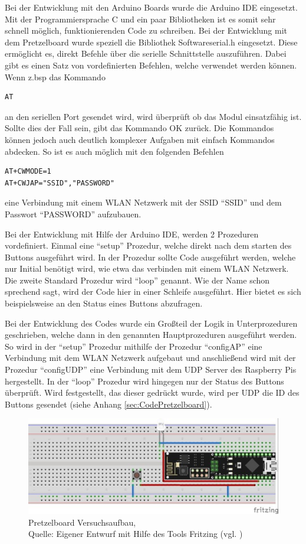 Bei der Entwicklung mit den Arduino Boards wurde die Arduino IDE eingesetzt.
Mit der Programmiersprache C und ein paar Bibliotheken ist es somit sehr schnell möglich, funktionierenden Code zu schreiben.
Bei der Entwicklung mit dem Pretzelboard wurde speziell die Bibliothek Softwareserial.h eingesetzt.
Diese ermöglicht es, direkt Befehle über die serielle Schnittstelle auszuführen.
Dabei gibt es einen Satz von vordefinierten Befehlen, welche verwendet werden können.
Wenn z.bsp das Kommando 
\begin{lstlisting}
AT
\end{lstlisting}
an den seriellen Port gesendet wird, wird überprüft ob das Modul einsatzfähig ist.
Sollte dies der Fall sein, gibt das Kommando OK zurück.
Die Kommandos können jedoch auch deutlich komplexer Aufgaben mit einfach Kommandos abdecken.
So ist es auch möglich mit den folgenden Befehlen
\begin{lstlisting}
AT+CWMODE=1
AT+CWJAP="SSID","PASSWORD"
\end{lstlisting}
eine Verbindung mit einem WLAN Netzwerk mit der SSID ``SSID'' und dem Passwort ``PASSWORD'' aufzubauen.

Bei der Entwicklung mit Hilfe der Arduino \ac{IDE}, werden 2 Prozeduren vordefiniert.
Einmal eine "`setup"' Prozedur, welche direkt nach dem starten des Buttons ausgeführt wird.
In der Prozedur sollte Code ausgeführt werden, welche nur Initial benötigt wird, wie etwa das verbinden mit einem \ac{WLAN} Netzwerk.
Die zweite Standard Prozedur wird "`loop"' genannt.
Wie der Name schon sprechend sagt, wird der Code hier in einer Schleife ausgeführt.
Hier bietet es sich beispielsweise an den Status eines Buttons abzufragen.

Bei der Entwicklung des Codes wurde ein Großteil der Logik in Unterprozeduren geschrieben, welche dann in den genannten Hauptprozeduren ausgeführt werden.
So wird in der "`setup"' Prozedur mithilfe der Prozedur "`configAP"' eine Verbindung mit dem \ac{WLAN} Netzwerk aufgebaut und anschließend wird mit der Prozedur "`configUDP"' eine Verbindung mit dem \ac{UDP} Server des Raspberry Pis hergestellt.
In der "`loop"' Prozedur wird hingegen nur der Status des Buttons überprüft.
Wird festgestellt, das dieser gedrückt wurde, wird per \ac{UDP} die ID des Buttons gesendet 
(siehe Anhang \ref{sec:CodePretzelboard}).

\begin{figure}[H]
	\centering
	\includegraphics[scale=1.5]{Pretzel_Fritzing.jpg}
	\caption[Pretzelboard Versuchsaufbau]{Pretzelboard Versuchsaufbau,\\ Quelle: Eigener Entwurf mit Hilfe des Tools Fritzing (vgl. \cite{.fritz})}
\end{figure}